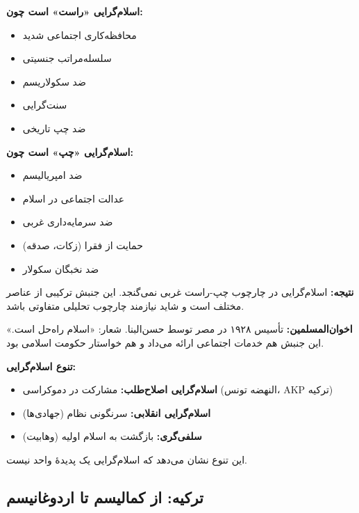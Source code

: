 \begin{debatebox}

\textbf{اسلام‌گرایی «راست» است چون:}
\begin{itemize}
    \item محافظه‌کاری اجتماعی شدید
    \item سلسله‌مراتب جنسیتی
    \item ضد سکولاریسم
    \item سنت‌گرایی
    \item ضد چپ تاریخی
\end{itemize}



\textbf{اسلام‌گرایی «چپ» است چون:}
\begin{itemize}
    \item ضد امپریالیسم
    \item عدالت اجتماعی در اسلام
    \item ضد سرمایه‌داری غربی
    \item حمایت از فقرا (زکات، صدقه)
    \item ضد نخبگان سکولار
\end{itemize}


\vspace{3mm}
\textbf{نتیجه:} اسلام‌گرایی در چارچوب چپ-راست غربی نمی‌گنجد. این جنبش ترکیبی از عناصر مختلف است و شاید نیازمند چارچوب تحلیلی متفاوتی باشد.
\end{debatebox}


\textbf{اخوان‌المسلمین:}
تأسیس ۱۹۲۸ در مصر توسط حسن‌البنا. شعار: «اسلام راه‌حل است.» این جنبش هم خدمات اجتماعی ارائه می‌داد و هم خواستار حکومت اسلامی بود.

\textbf{تنوع اسلام‌گرایی:}
\begin{itemize}
    \item \textbf{اسلام‌گرایی اصلاح‌طلب:} مشارکت در دموکراسی (النهضه تونس، AKP ترکیه)
    \item \textbf{اسلام‌گرایی انقلابی:} سرنگونی نظام (جهادی‌ها)
    \item \textbf{سلفی‌گری:} بازگشت به اسلام اولیه (وهابیت)
\end{itemize}

این تنوع نشان می‌دهد که اسلام‌گرایی یک پدیدهٔ واحد نیست.


\subsection{ترکیه: از کمالیسم تا اردوغانیسم}

